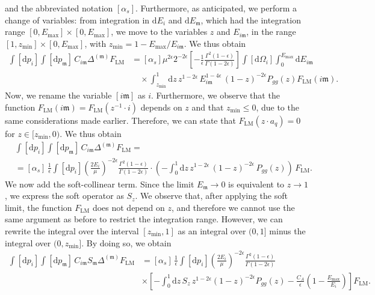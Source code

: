 \documentclass[a4paper, 12pt]{book}
\newcommand{\um}{\mathfrak{m}}
\begin{document}
and the abbreviated notation $[\alpha_s]$. Furthermore, as anticipated, we perform a change of variables: from integration in $\mathrm{d}E_i$ and $\mathrm{d}E_\um$, which had the integration range $[0,E_{\mathrm{max}}]\times [0,E_{\mathrm{max}}]$, we move to the variables $z$ and $E_{i\um}$, in the range $[1,z_{\mathrm{min}}]\times [0,E_{\mathrm{max}}]$, with $z_{\mathrm{min}}=1-E_{\mathrm{max}}/E_{i\um}$. We thus obtain
\begin{align}
  \int [\mathrm{d}p_i] \int [\mathrm{d}p_\um] \, C_{i\um} \Delta^{(\um)} F_{\mathrm{LM}} 
  &= [\alpha_s] \mu^{2\epsilon}2^{-2\epsilon}\left[- \frac{1}{\epsilon} \frac{\Gamma^2(1-\epsilon)}{\Gamma(1-2\epsilon)} \right] \int [\mathrm{d}\Omega_i]\int_0^{E_{\mathrm{max}}} \mathrm{d}E_{i\um} \nonumber \\
  &\quad \times \int_{z_{\mathrm{min}}}^{1} \mathrm{d}z \, z^{1-2\epsilon} \, E_{i\um}^{1-4\epsilon} \,(1-z)^{-2\epsilon}P_{gg}(z)F_{\mathrm{LM}}(i\um) .
\end{align}
Now, we rename the variable $[i\um]$ as $i$. Furthermore, we observe that the function $F_{\mathrm{LM}}(i\um)=F_{\mathrm{LM}}(z^{-1}\cdot i)$ depends on $z$ and that $z_{\mathrm{min}}\leq0$, due to the same considerations made earlier. Therefore, we can state that $F_{\mathrm{LM}}(z \cdot a_q) = 0$ for $z \in [z_{\mathrm{min}}, 0)$. We thus obtain
\begin{equation}
  \begin{split}
  & \int [\mathrm{d}p_i] \int [\mathrm{d}p_\um] \, C_{i\um} \Delta^{(\um)} F_{\mathrm{LM}} = \\
  & = [\alpha_s] \, \frac{1}{\epsilon} \int[\mathrm{d}p_i] \left(\frac{2E_i}{\mu} \right)^{-2\epsilon} \frac{\Gamma^2(1-\epsilon)}{\Gamma(1-2\epsilon)} \cdot \left( - \int_0^1 \mathrm{d}z \, z^{1-2\epsilon} \, (1-z)^{-2\epsilon} \, P_{gg}(z)\right) \, F_{\mathrm{LM}} .
  \end{split}
\end{equation}
We now add the soft-collinear term. Since the limit $E_{\um} \to 0$ is equivalent to $z \to 1$, we express the soft operator as $S_z$. We observe that, after applying the soft limit, the function $F_{\mathrm{LM}}$ does not depend on $z$, and therefore we cannot use the same argument as before to restrict the integration range. However, we can rewrite the integral over the interval $[z_{\mathrm{min}},1]$ as an integral over $(0,1]$ minus the integral over $(0,z_{\mathrm{min}}]$. By doing so, we obtain
\begin{align}
  \int [\mathrm{d}p_i] \int [\mathrm{d}p_\um] \, C_{i\um} S_{\um} \Delta^{(\um)} F_{\mathrm{LM}} 
  &= [\alpha_s] \, \frac{1}{\epsilon} \int[\mathrm{d}p_i] \left(\frac{2E_i}{\mu} \right)^{-2\epsilon} \frac{\Gamma^2(1-\epsilon)}{\Gamma(1-2\epsilon)} \nonumber \\
  & \times \left[ - \int_0^1 \mathrm{d}z \, S_z \, z^{1-2\epsilon} (1-z)^{-2\epsilon} P_{gg}(z) - \frac{C_A}{\epsilon} \left(1-\frac{E_{\text{max}}}{E_i}\right) \right] F_{\mathrm{LM}} .
\end{align}
\end{document}
